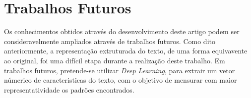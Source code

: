 \section{Trabalhos Futuros}

Os conhecimentos obtidos através do desenvolvimento deste artigo podem ser 
consideravelmente ampliados através de trabalhos futuros. Como dito 
anteriormente, a representação extruturada do texto, de uma forma equivavente 
ao original, foi uma difícil etapa durante a realização deste trabalho. Em 
trabalhos futuros, pretende-se utilizar \textit{Deep Learning}, para extrair um 
vetor númerico de caracteristicas do texto, com o objetivo de mensurar com 
maior representatividade os padrões encontrados.
